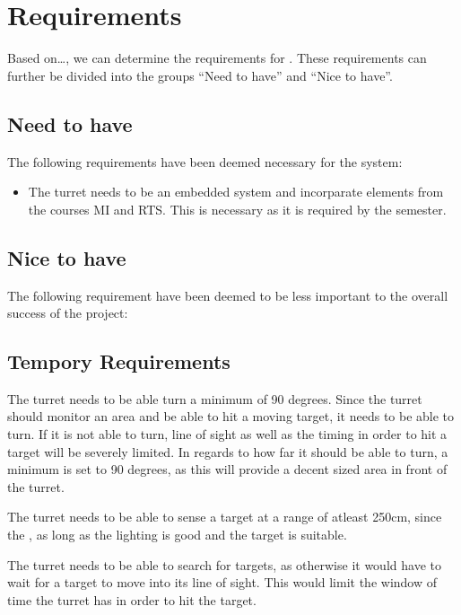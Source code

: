 \section{Requirements}

Based on\ldots, we can determine the requirements for \namep. These requirements
can further be divided into the groups ``Need to have'' and ``Nice to have''. 

\subsection{Need to have}
The following requirements have been deemed necessary for the system:

\begin{itemize}
  \item The turret needs to be an embedded system and incorparate elements from
  the courses MI and RTS. This is necessary as it is required by the semester.

  
\end{itemize}

\subsection{Nice to have}
The following requirement have been deemed to be less important to the overall
success of the project:


\subsection{Tempory Requirements}

The turret needs to be able turn a minimum of 90 degrees. Since the turret
should monitor an area and be able to hit a moving target, it needs to be able
to turn. If it is not able to turn, line of sight as well as the timing in
order to hit a target will be severely limited. In regards to how far it should
be able to turn, a minimum is set to 90 degrees, as this will provide a decent
sized area in front of the turret.

The turret needs to be able to sense a target at a range of atleast 250cm,
since the , as long as the lighting is good
and the target is suitable.


The turret needs to be able to search for targets, as otherwise it would have
to wait for a target to move into its line of sight. This would limit the
window of time the turret has in order to hit the target.

